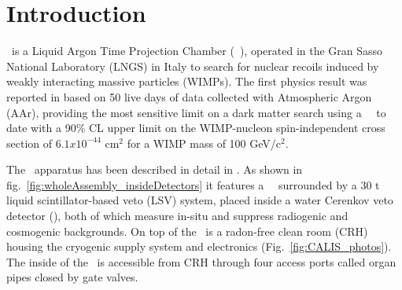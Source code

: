 \section{Introduction}\label{sec:intro}\label{sec:introduction}

\dsf\ is a Liquid Argon Time Projection Chamber (\lar\ \tpc), operated in the Gran Sasso National Laboratory (LNGS) in Italy to search for nuclear recoils induced by weakly interacting massive particles (WIMPs). The first physics result was reported in \cite{Agnes:2015gu} based on 50 live days of data collected with Atmospheric Argon (AAr), providing the most sensitive limit on a dark matter search using a \lar\ \tpc\ to date with a 90\% CL upper limit on the WIMP-nucleon spin-independent cross section of $6.1 x 10^{-44}$ cm$^2$ for a WIMP mass of 100 GeV/c$^2$.  %

The \dsf\ apparatus has been described in detail in \cite{Agnes:2015gu}. As shown in fig.~\ref{fig:wholeAssembly_insideDetectors} it features a \lar\ \tpc\ surrounded by a 30 t liquid scintillator-based veto (LSV) system, placed inside a water Cerenkov veto detector (\wcv), both of which measure in-situ and suppress radiogenic and cosmogenic backgrounds. On top of the \wcv\ is a radon-free clean room (CRH) housing the cryogenic supply system and electronics (Fig.~\ref{fig:CALIS_photos}). The inside of the \lsv\ is accessible from CRH through four access ports called organ pipes closed by gate valves. 


